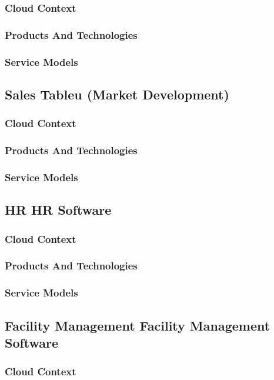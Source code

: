 \documentclass{llncs}
\begin{document}
\subsubsection{Cloud Context}
\subsubsection{Products And Technologies}
\subsubsection{Service Models}

\subsection{Sales Tableu (Market Development)}
\subsubsection{Cloud Context}
\subsubsection{Products And Technologies}
\subsubsection{Service Models}

\subsection{HR HR Software}
\subsubsection{Cloud Context}
\subsubsection{Products And Technologies}
\subsubsection{Service Models}

\subsection{Facility Management	Facility Management Software}
\subsubsection{Cloud Context}
\end{document}
